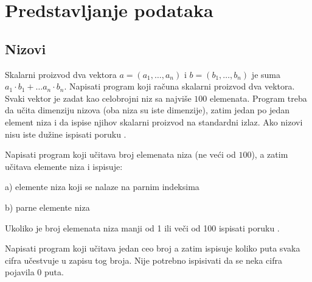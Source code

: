 
\chapter{Predstavljanje podataka}

\section{Nizovi}



\begin{Exercise}[label=v2.1_01] 
Skalarni proizvod dva vektora $a = (a_1, \ldots, a_n)$ i $b = (b_1,
\ldots, b_n)$ je suma $a_1\cdot b_1 + \ldots a_n\cdot b_n$. Napisati
program koji računa skalarni proizvod dva vektora. Svaki vektor je
zadat kao celobrojni niz sa najviše $100$ elemenata. Program treba da
učita dimenziju nizova (oba niza su iste dimenzije), zatim jedan po
jedan element niza i da ispise njihov skalarni proizvod na standardni
izlaz. Ako nizovi nisu iste dužine ispisati poruku .
\end{Exercise}
\begin{Answer}[ref=v2.1_01]
\end{Answer}

\begin{Exercise}[label=v2.1_02] 
Napisati program koji učitava broj elemenata niza (ne veći od $100$),
a zatim učitava elemente niza i ispisuje:
\begin{description}
   \item{a)} elemente niza koji se nalaze na parnim indeksima
   \item{b)} parne elemente niza
\end{description}
Ukoliko je broj elemenata niza manji od 1 ili veči od 100 ispisati
poruku .  
\end{Exercise}
\begin{Answer}[ref=v2.1_02]
\end{Answer}

\begin{Exercise}[label=v2.1_03] 
Napisati program koji učitava jedan ceo broj a zatim ispisuje koliko
puta svaka cifra učestvuje u zapisu tog broja. Nije potrebno
ispisivati da se neka cifra pojavila $0$ puta. 
\end{Exercise}
\begin{Answer}[ref=v2.1_03]
\end{Answer}

